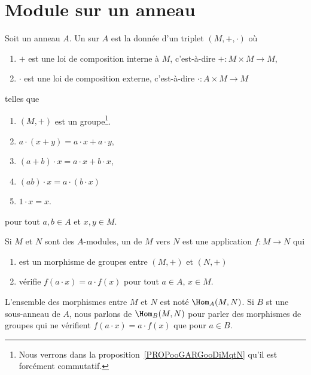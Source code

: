 \section{Module sur un anneau}

\begin{definition}       \label{DEFooHXITooBFvzrR}
	Soit un anneau \( A\). Un  sur \( A\) est la donnée d'un triplet \( (M,+,\cdot)\) où
	\begin{enumerate}
		\item
		      \( +\) est une loi de composition interne à \( M\), c'est-à-dire \( +\colon M\times M\to M\),
		\item
		      \( \cdot\) est une loi de composition externe, c'est-à-dire \( \cdot\colon A\times M\to M\)
	\end{enumerate}
	telles que
	\begin{enumerate}
		\item
		      \( (M,+)\) est un groupe\footnote{Nous verrons dans la proposition~\ref{PROPooGARGooDiMqtN} qu'il est forcément commutatif.}.
		\item
		      \( a\cdot(x+y)=a\cdot x+a\cdot y\),
		\item
		      \( (a+b)\cdot x=a\cdot x+b\cdot x\),
		\item
		      \( (ab)\cdot x=a\cdot(b\cdot x)\)
		\item
		      \( 1\cdot x=x\).
	\end{enumerate}
	pour tout \( a,b\in A\) et \( x,y\in M\).

	Si \( M\) et \( N\) sont des \( A\)-modules, un  de \( M\) vers \( N\) est une application \( f\colon M\to N\) qui
	\begin{enumerate}
		\item
		      est un morphisme de groupes entre \( (M,+)\) et \( (N,+)\)
		\item
		      vérifie \( f(a\cdot x)=a\cdot f(x)\) pour tout \( a\in A\), \( x\in M\).
	\end{enumerate}
	L'ensemble des morphismes entre \( M\) et \( N\) est noté \( \Hom_A(M,N)\). Si \( B\) st une sous-anneau de \( A\),  nous parlons de \( \Hom_B(M,N)\) pour parler des morphismes de groupes qui ne vérifient \( f(a\cdot x)=a\cdot f(x)\) que pour \( a\in B\).
\end{definition}

